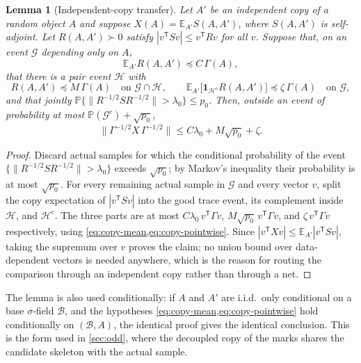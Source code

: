 \documentclass[11pt]{article}
\newtheorem{lemma}[lemma]{Lemma}
\theoremstyle{definition}
\theoremstyle{remark}
\newcommand{\E}{\mathbb E}
\newcommand{\bbP}{\mathbb P}
\newcommand{\1}{\mathbf 1}
\newcommand{\cB}{\mathcal B}
\newcommand{\cG}{\mathcal G}
\newcommand{\cH}{\mathcal H}
\numberwithin{equation}{section}
\begin{document}
\begin{lemma}[Independent-copy transfer]\label{lem:copy-transfer}
Let $A'$ be an independent copy of a random object $A$ and suppose
$X(A)=\E_{A'}S(A,A')$, where $S(A,A')$ is self-adjoint.  Let
$R(A,A')\succ0$ satisfy $|v^{\mathsf T}Sv|\le v^{\mathsf T}Rv$ for all
$v$.  Suppose that, on an event $\cG$ depending only on $A$,
\begin{equation}\label{eq:copy-mean}
 \E_{A'}R(A,A')\preceq C\,\Gamma(A),
\end{equation}
that there is a pair event $\cH$ with
\begin{equation}\label{eq:copy-pointwise}
 R(A,A')\preceq M\,\Gamma(A)\quad\text{on }\cG\cap\cH,
 \qquad
 \E_{A'}\bigl[\1_{\cH^c}R(A,A')\bigr]\preceq\zeta\,\Gamma(A)
 \quad\text{on }\cG,
\end{equation}
and that jointly
$\bbP\{\|R^{-1/2}SR^{-1/2}\|>\lambda_0\}\le p_0$.  Then, outside an event
of probability at most $\bbP(\cG^c)+\sqrt{p_0}$,
\begin{equation}\label{eq:copy-conclusion}
 \|\Gamma^{-1/2}X\,\Gamma^{-1/2}\|
 \le C\lambda_0+M\sqrt{p_0}+\zeta.
\end{equation}
\end{lemma}
\begin{proof}
Discard actual samples for which the conditional probability of the event
$\{\|R^{-1/2}SR^{-1/2}\|>\lambda_0\}$ exceeds $\sqrt{p_0}$; by Markov's
inequality their probability is at most $\sqrt{p_0}$.  For every
remaining actual sample in $\cG$ and every vector $v$, split the copy
expectation of $|v^{\mathsf T}Sv|$ into the good trace event, its
complement inside $\cH$, and $\cH^c$.  The three parts are at most
$C\lambda_0\,v^{\mathsf T}\Gamma v$,
$M\sqrt{p_0}\,v^{\mathsf T}\Gamma v$,
and $\zeta\,v^{\mathsf T}\Gamma v$ respectively, using
\cref{eq:copy-mean,eq:copy-pointwise}.  Since
$|v^{\mathsf T}Xv|\le\E_{A'}|v^{\mathsf T}Sv|$, taking the supremum
over $v$ proves the claim; no union bound over data-dependent vectors
is needed anywhere, which is the reason for routing the comparison
through an independent copy rather than through a net.
\end{proof}

The lemma is also used conditionally: if $A$ and $A'$ are i.i.d.\ only
conditional on a base $\sigma$-field $\cB$, and the hypotheses
\cref{eq:copy-mean,eq:copy-pointwise} hold conditionally on
$(\cB,A)$, the identical proof gives the identical conclusion.
This is the form used in \cref{sec:odd}, where the decoupled copy of
the marks shares the candidate skeleton with the actual sample.
\end{document}
